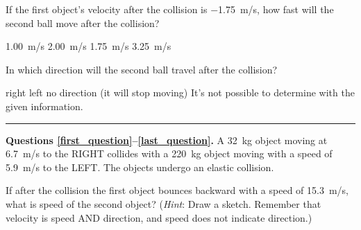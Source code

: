 \documentclass[../main-physics-problems.tex]{subfiles}
\begin{document}
\begin{questions}
\begin{center}
\def\xa{1.5}
\def\xb{8.5}
\def\y{3}
\def\rb{6mm}
\end{center}

\question \label{SGv3JM}
If the first object's velocity after the collision is \SI{-1.75}{m/s}, how fast will the second ball move after the collision?

\begin{randomizechoices}
\choice \SI{1.00}{m/s}
\correctchoice \SI{2.00}{m/s} 
\choice \SI{1.75}{m/s}
\choice \SI{3.25}{m/s}
\end{randomizechoices}

\question \label{jlNXIi}
In which direction will the second ball travel after the collision?

\begin{randomizechoices}
\correctchoice right
\choice left
\choice no direction (it will stop moving)
\choice It's not possible to determine with the given information.
\end{randomizechoices}

\bigskip

\hrule

\begin{EnvUplevel}
\textbf{Questions \ref{first_question}--\ref{last_question}.} A \SI{32}{kg} object moving at \SI{6.7}{m/s} to the RIGHT collides with a \SI{220}{kg} object moving with a speed of \SI{5.9}{m/s} to the LEFT. The objects undergo an elastic collision.
\end{EnvUplevel}

\question \label{first_question}
 If after the collision the first object bounces backward with a speed of \SI{15.3}{m/s}, what is speed of the second object? (\textit{Hint}: Draw a sketch. Remember that velocity is speed AND direction, and speed does not indicate direction.)


\end{questions}
\end{document}
